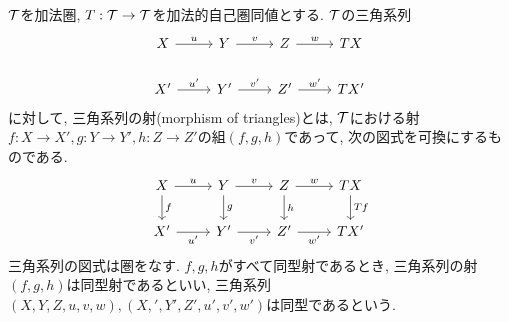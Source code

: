 \documentclass[uplatex, a4paper, 14Q, dvipdfmx]{jsarticle}
\begin{document}
\begin{definition}[三角系列の射]
  $\mathcal{T}$を加法圏, $T: \mathcal{T} \to \mathcal{T}$を加法的自己圏同値とする. 
  $\mathcal{T}$の三角系列
  \[\begin{tikzcd}
    X & Y & Z & TX \\
    {X'} & {Y'} & {Z'} & {TX'}
    \arrow["u", from=1-1, to=1-2]
    \arrow["v", from=1-2, to=1-3]
    \arrow["w", from=1-3, to=1-4]
    \arrow["{u'}", from=2-1, to=2-2]
    \arrow["{v'}", from=2-2, to=2-3]
    \arrow["{w'}", from=2-3, to=2-4]
  \end{tikzcd}\]
  に対して, 三角系列の射(morphism of triangles)とは, $\mathcal{T}$における射$f: X \to X', g: Y \to Y', h: Z \to Z'$の組$(f,g,h)$であって, 次の図式を可換にするものである. 
  \[\begin{tikzcd}
    X & Y & Z & TX \\
    {X'} & {Y'} & {Z'} & {TX'}
    \arrow["u", from=1-1, to=1-2]
    \arrow["v", from=1-2, to=1-3]
    \arrow["w", from=1-3, to=1-4]
    \arrow["f", from=1-1, to=2-1]
    \arrow["g", from=1-2, to=2-2]
    \arrow["h", from=1-3, to=2-3]
    \arrow["Tf", from=1-4, to=2-4]
    \arrow["{u'}"', from=2-1, to=2-2]
    \arrow["{v'}"', from=2-2, to=2-3]
    \arrow["{w'}"', from=2-3, to=2-4]
  \end{tikzcd}\]
  三角系列の図式は圏をなす. 
  $f,g,h$がすべて同型射であるとき, 三角系列の射$(f,g,h)$は同型射であるといい, 三角系列$(X,Y,Z,u,v,w), (X,',Y',Z',u',v',w')$は同型であるという. 
\end{definition}
\end{document}
